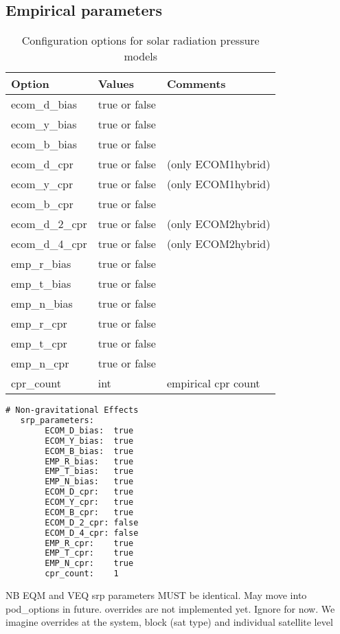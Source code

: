 \subsection{Empirical parameters}
\begin{table}[h!]
	\begin{tabular}{|p{4.5cm}|p{2cm}|p{3.5cm}|}
		\hline
		Option & Values & Comments \\
		\hline
		ecom\_d\_bias & true or false & \\ 
		ecom\_y\_bias & true or false & \\ 
		ecom\_b\_bias & true or false & \\ 
		ecom\_d\_cpr & true or false & (only ECOM1\/hybrid)\\ 
		ecom\_y\_cpr & true or false & (only ECOM1\/hybrid)\\ 
		ecom\_b\_cpr & true or false & \\
		ecom\_d\_2\_cpr & true or false &  (only ECOM2\/hybrid)\\ 
		ecom\_d\_4\_cpr & true or false & (only ECOM2\/hybrid) \\
		emp\_r\_bias & true or false & \\
		emp\_t\_bias & true or false & \\ 
		emp\_n\_bias  & true or false & \\
		emp\_r\_cpr  & true or false & \\
		emp\_t\_cpr  & true or false & \\
		emp\_n\_cpr & true or false & \\
		cpr\_count  & int & empirical cpr count \\
		\hline
	\end{tabular}
	\caption{Configuration options for solar radiation pressure models}
	\label{table:label_name}
\end{table}
%
{\small
	\begin{lstlisting}[language=xml,caption=yaml example for srp parameters]
	# Non-gravitational Effects
   srp_parameters:
		ECOM_D_bias:  true
		ECOM_Y_bias:  true
		ECOM_B_bias:  true
		EMP_R_bias:   true
		EMP_T_bias:   true
		EMP_N_bias:   true
		ECOM_D_cpr:   true
		ECOM_Y_cpr:   true
		ECOM_B_cpr:   true
		ECOM_D_2_cpr: false
		ECOM_D_4_cpr: false
		EMP_R_cpr:    true
		EMP_T_cpr:    true
		EMP_N_cpr:    true
		cpr_count:    1
	\end{lstlisting}
}


NB EQM and VEQ srp parameters MUST be identical. May move into pod\_options in future.
overrides are not implemented yet. Ignore for now. We imagine overrides at the system, block (sat type) and individual satellite level



